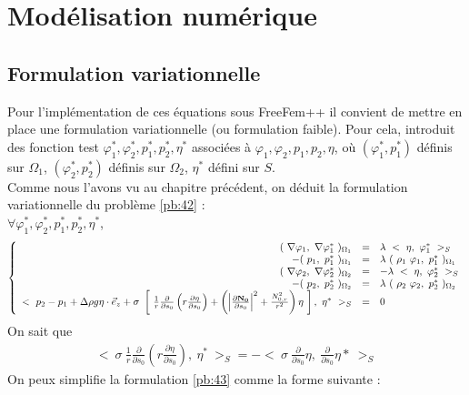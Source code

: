 \documentclass[a4paper]{report}
\begin{document}
\section{Modélisation numérique}
\subsection{Formulation variationnelle}
Pour l'implémentation de ces équations sous FreeFem++ il convient de mettre en place une formulation variationnelle (ou formulation faible). Pour cela, introduit des fonction test $\varphi^*_1, \varphi^*_2, p^*_1, p^*_2, \eta^*$ associées à $\varphi_1, \varphi_2, p_1, p_2, \eta$, où $(\varphi^*_1, p^*_1)$ définis sur $\Omega_1$, $(\varphi^*_2, p^*_2)$ définis sur $\Omega_2$, $\eta^*$ défini sur $S$.
\\[0.25cm]
Comme nous l'avons vu au chapitre précédent, on déduit la formulation variationnelle du problème \eqref{pb:42} :
\\[0.25cm]
$\forall \varphi^*_1, \varphi^*_2, p^*_1, p^*_2, \eta^*$,
\begin{eqnarray}\label{pb:43}
\left\{
\begin{array}{rcl}
(\ \nabla \varphi_1 ,\ \nabla \varphi^*_1 \ )_{\Omega_1} &=& \lambda\ <\ \eta,\ \varphi^*_1 \ >_S \\
- (\ p_1 ,\ p^*_1 \ )_{\Omega_1} &=& \lambda\ (\ \rho_1\ \varphi_1 ,\ p^*_1 \ )_{\Omega_1} \\
(\ \nabla \varphi_2 ,\ \nabla \varphi^*_2 \ )_{\Omega_2} &=& - \lambda\ <\ \eta,\ \varphi^*_2 \ >_S \\
- (\ p_2 ,\ p^*_2 \ )_{\Omega_2} &=& \lambda\ (\ \rho_2\ \varphi_2 ,\ p^*_2 \ )_{\Omega_2} \\
<\ p_2 - p_1 + \Delta{\rho} g \eta \cdot \vec{e}_z + \sigma\ \left[\
\frac{1}{r} \frac{\partial}{\partial s_0} \left( r \frac{\partial \eta}{\partial s_0} \right)
+
\left( \left| \frac{\partial \bf N_0}{\partial s_0} \right|^2  + \frac{N_{0,r}^2}{r^2} \right) \eta
\ \right] ,\ \eta^* \ >_S &=& 0
\end{array}
\right.
\end{eqnarray}
On sait que
\begin{eqnarray*}
<\ \sigma\ \frac{1}{r} \frac{\partial}{\partial s_0} \left( r \frac{\partial \eta}{\partial s_0} \right) ,\ \eta^* \ >_S
=
- <\ \sigma\ \frac{\partial}{\partial s_0} \eta ,\ \frac{\partial}{\partial s_0} \eta* \ >_S
\end{eqnarray*}
On peux simplifie la formulation \eqref{pb:43} comme la forme suivante :
\end{document}
